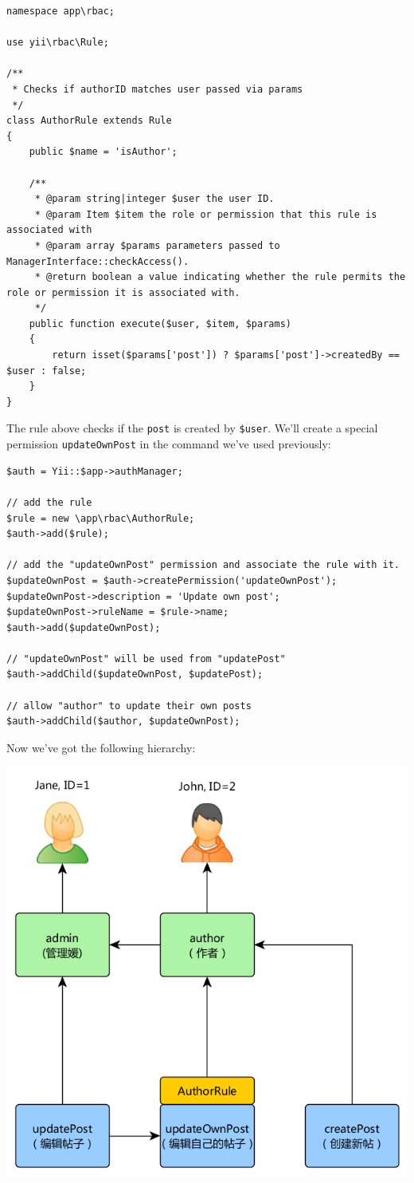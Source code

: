 \lstset{language=php}\begin{lstlisting}
namespace app\rbac;

use yii\rbac\Rule;

/**
 * Checks if authorID matches user passed via params
 */
class AuthorRule extends Rule
{
    public $name = 'isAuthor';

    /**
     * @param string|integer $user the user ID.
     * @param Item $item the role or permission that this rule is associated with
     * @param array $params parameters passed to ManagerInterface::checkAccess().
     * @return boolean a value indicating whether the rule permits the role or permission it is associated with.
     */
    public function execute($user, $item, $params)
    {
        return isset($params['post']) ? $params['post']->createdBy == $user : false;
    }
}
\end{lstlisting}
The rule above checks if the \lstinline|post| is created by \lstinline|$user|. We'll create a special permission \lstinline|updateOwnPost| in the
command we've used previously:

\lstset{language=php}\begin{lstlisting}
$auth = Yii::$app->authManager;

// add the rule
$rule = new \app\rbac\AuthorRule;
$auth->add($rule);

// add the "updateOwnPost" permission and associate the rule with it.
$updateOwnPost = $auth->createPermission('updateOwnPost');
$updateOwnPost->description = 'Update own post';
$updateOwnPost->ruleName = $rule->name;
$auth->add($updateOwnPost);

// "updateOwnPost" will be used from "updatePost"
$auth->addChild($updateOwnPost, $updatePost);

// allow "author" to update their own posts
$auth->addChild($author, $updateOwnPost);
\end{lstlisting}
Now we've got the following hierarchy:

\noindent\includegraphics[width=\textwidth]{images/rbac-hierarchy-2.png}

